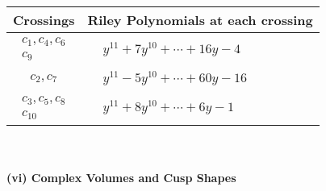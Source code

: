 \documentclass[1p]{elsarticle_modified}
\theoremstyle{definition}
\begin{document}
\begin{tabular}{m{50pt}|m{274pt}}
Crossings & \hspace{64pt}Riley Polynomials at each crossing \\
\hline $$\begin{aligned}c_{1},c_{4},c_{6}\\c_{9}\end{aligned}$$&$\begin{aligned}
&y^{11}+7 y^{10}+\cdots+16 y-4
\end{aligned}$\\
\hline $$\begin{aligned}c_{2},c_{7}\end{aligned}$$&$\begin{aligned}
&y^{11}-5 y^{10}+\cdots+60 y-16
\end{aligned}$\\
\hline $$\begin{aligned}c_{3},c_{5},c_{8}\\c_{10}\end{aligned}$$&$\begin{aligned}
&y^{11}+8 y^{10}+\cdots+6 y-1
\end{aligned}$\\
\hline
\end{tabular}\\~\\
\newpage\flushleft \textbf{(vi) Complex Volumes and Cusp Shapes}
\end{document}
